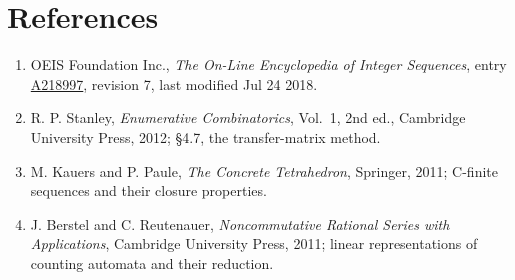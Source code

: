 \documentclass[11pt]{article}
\theoremstyle{definition}
\begin{document}
\section{References}

\begin{enumerate}

\item OEIS Foundation Inc., \emph{The On-Line Encyclopedia of Integer Sequences}, entry \href{https://oeis.org/A218997}{A218997}, revision 7, last modified Jul 24 2018.

\item R. P. Stanley, \emph{Enumerative Combinatorics}, Vol.~1, 2nd ed., Cambridge University Press, 2012; \S4.7, the transfer-matrix method.

\item M. Kauers and P. Paule, \emph{The Concrete Tetrahedron}, Springer, 2011; C-finite sequences and their closure properties.

\item J. Berstel and C. Reutenauer, \emph{Noncommutative Rational Series with Applications}, Cambridge University Press, 2011; linear representations of counting automata and their reduction.

\end{enumerate}
\end{document}
